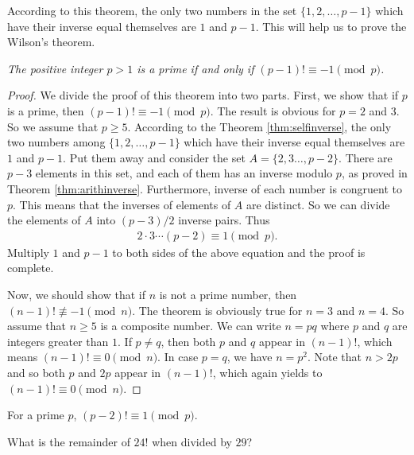 \documentclass{subfile}
\begin{document}
	According to this theorem, the only two numbers in the set $\{1, 2, \ldots, p-1\}$ which have their inverse equal themselves are $1$ and $p-1$. This will help us to prove the Wilson's theorem.
		\begin{theorem}  \slshape
			The positive integer $p>1$ is a prime if and only if $(p-1)! \equiv -1 \pmod p$.
		\end{theorem}

		\begin{proof}
			We divide the proof of this theorem into two parts. First, we show that if $p$ is a prime, then $(p-1)! \equiv -1 \pmod p$.
			The result is obvious for $p=2$ and $3$. So we assume that $p \geq 5$. According to the Theorem \ref{thm:selfinverse}, the only two numbers among  $\{1, 2, \ldots, p-1\}$ which have their inverse equal themselves are $1$ and $p-1$. Put them away and consider the set  $A=\{2, 3 \ldots, p-2\}$. There are $p-3$ elements in this set, and each of them has an inverse modulo $p$, as proved in Theorem \ref{thm:arithinverse}. Furthermore, inverse of each number is congruent to $p$. This means that the inverses of elements of $A$ are distinct. So we can divide the elements of $A$ into $(p-3)/2$ inverse pairs. Thus
			\begin{align*}
			2 \cdot 3  \cdots  (p-2) \equiv 1 \pmod p.
			\end{align*}
			Multiply $1$ and $p-1$ to both sides of the above equation and the proof is complete.

			Now, we should show that if $n$ is not a prime number, then $(n-1)! \not \equiv -1 \pmod n$.
			The theorem is obviously true for $n=3$ and $n=4$. So assume that $n \geq 5$ is a composite number. We can write $n=pq$ where $p$ and $q$ are integers greater than $1$. If $p \neq q$, then both $p$ and $q$ appear in $(n-1)!$, which means $(n-1)! \equiv 0 \pmod n$. In case $p=q$, we have $n=p^2$. Note that $n>2p$ and so both $p$ and $2p$ appear in $(n-1)!$, which again yields to $(n-1)! \equiv 0 \pmod n$.
		\end{proof}

		\begin{corollary}
			For a prime $p$, $(p-2)! \equiv 1 \pmod p$.
		\end{corollary}

		\begin{problem}
			What is the remainder of $24!$ when divided by $29$?
		\end{problem}
\end{document}

